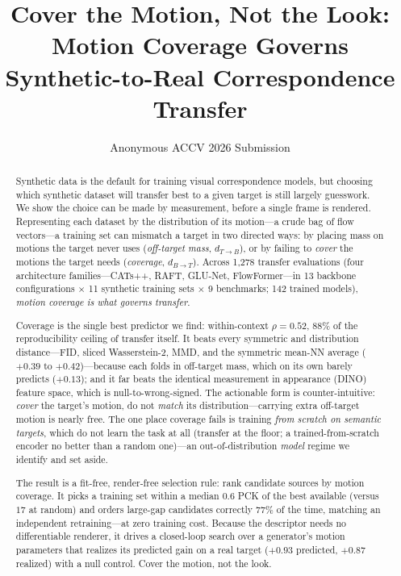 \documentclass[runningheads]{llncs}
\newcommand{\dtb}{d_{T\to B}}
\newcommand{\dbt}{d_{B\to T}}
\newcommand{\pck}{PCK}
\begin{document}
\title{Cover the Motion, Not the Look: Motion Coverage Governs
Synthetic-to-Real Correspondence Transfer}

\author{Anonymous ACCV 2026 Submission}

\maketitle

\begin{abstract}
Synthetic data is the default for training visual correspondence models, but
choosing which synthetic dataset will transfer best to a given target is still
largely guesswork. We show the choice can be made by measurement, before a
single frame is rendered. Representing each dataset by the distribution of its
motion---a crude bag of flow vectors---a training set can mismatch a target in
two directed ways: by placing mass on motions the target never uses
(\emph{off-target mass}, $\dtb$), or by failing to \emph{cover} the motions the
target needs (\emph{coverage}, $\dbt$). Across 1{,}278 transfer evaluations
(four architecture families---CATs++, RAFT, GLU-Net, FlowFormer---in 13 backbone
configurations $\times$ 11 synthetic training sets $\times$ 9 benchmarks; 142
trained models), \emph{motion coverage is what governs transfer}.

Coverage is the single best predictor we find: within-context $\rho{=}0.52$,
$88\%$ of the reproducibility ceiling of transfer itself. It beats every
symmetric and distribution distance---FID, sliced Wasserstein-2, MMD, and the
symmetric mean-NN average ($+0.39$ to $+0.42$)---because each folds in off-target
mass, which on its own barely predicts ($+0.13$); and it far beats the identical
measurement in appearance (DINO) feature space, which is null-to-wrong-signed.
The actionable form is counter-intuitive: \emph{cover} the target's motion,
do not \emph{match} its distribution---carrying extra off-target motion is
nearly free. The one place coverage fails is training \emph{from scratch on
semantic targets}, which do not learn the task at all (transfer at the floor; a
trained-from-scratch encoder no better than a random one)---an
out-of-distribution \emph{model} regime we identify and set aside.

The result is a fit-free, render-free selection rule: rank candidate sources by
motion coverage. It picks a training set within a median $0.6$ \pck{} of the
best available (versus $17$ at random) and orders large-gap candidates correctly
$77\%$ of the time, matching an independent retraining---at zero training cost.
Because the descriptor needs no differentiable renderer, it drives a closed-loop
search over a generator's motion parameters that realizes its predicted gain on
a real target ($+0.93$ predicted, $+0.87$ realized) with a null control. Cover
the motion, not the look.
\end{abstract}
\end{document}

